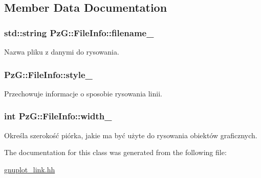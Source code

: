 \subsection{Member Data Documentation}
\subsubsection[{\texorpdfstring{filename\+\_\+}{filename_}}]{\setlength{\rightskip}{0pt plus 5cm}std\+::string Pz\+G\+::\+File\+Info\+::filename\+\_\+\hspace{0.3cm}{\ttfamily [private]}}\hypertarget{class_pz_g_1_1_file_info_a04f77a755e72bcf379844b15d9f0f3ed}{}\label{class_pz_g_1_1_file_info_a04f77a755e72bcf379844b15d9f0f3ed}
Nazwa pliku z danymi do rysowania. 
\subsubsection[{\texorpdfstring{style\+\_\+}{style_}}]{ Pz\+G\+::\+File\+Info\+::style\+\_\+\hspace{0.3cm}{\ttfamily [private]}}\hypertarget{class_pz_g_1_1_file_info_a9141a03aee9840ebe103e4b1b6fa5c9b}{}\label{class_pz_g_1_1_file_info_a9141a03aee9840ebe103e4b1b6fa5c9b}
Przechowuje informacje o sposobie rysowania linii. 
\subsubsection[{\texorpdfstring{width\+\_\+}{width_}}]{\setlength{\rightskip}{0pt plus 5cm}int Pz\+G\+::\+File\+Info\+::width\+\_\+\hspace{0.3cm}{\ttfamily [private]}}\hypertarget{class_pz_g_1_1_file_info_a1a1d3ea502a2604eec731ca50a2b438f}{}\label{class_pz_g_1_1_file_info_a1a1d3ea502a2604eec731ca50a2b438f}
Określa szerokość piórka, jakie ma być użyte do rysowania obiektów graficznych. 

The documentation for this class was generated from the following file\+:\begin{DoxyCompactItemize}
\item 
\hyperlink{gnuplot__link_8hh}{gnuplot\+\_\+link.\+hh}\end{DoxyCompactItemize}
